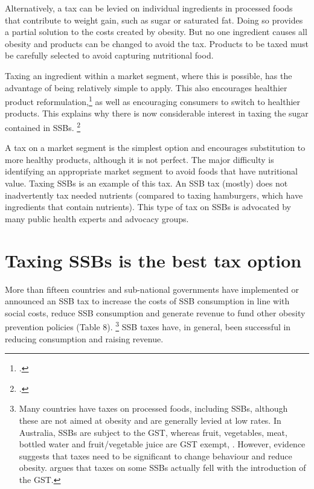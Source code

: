 \documentclass[embargoed]{grattan}
\begin{document}
Alternatively, a tax can be levied on individual ingredients in processed foods that contribute to weight gain, such as sugar or saturated fat.
Doing so provides a partial solution to the costs created by obesity.
But no one ingredient causes all obesity and products can be changed to avoid the tax.
Products to be taxed must be carefully selected to avoid capturing nutritional food.

Taxing an ingredient within a market segment, where this is possible, has the advantage of being relatively simple to apply.
This also encourages healthier product reformulation,\footcite{Team2016Sugarlevyworking} as well as encouraging consumers to switch to healthier products.
This explains why there is now considerable interest in taxing the sugar contained in SSBs.%
\footcites{Smith2016SoftDrinksLevy}{SouthAfricaNationalTreasury2016TaxationSugarSweetened}

A tax on a market segment is the simplest option and encourages substitution to more healthy products, although it is not perfect.
The major difficulty is identifying an appropriate market segment to avoid foods that have nutritional value.
Taxing SSBs is an example of this tax.
An SSB tax (mostly) does not inadvertently tax needed nutrients (compared to taxing hamburgers, which have ingredients that contain nutrients).
This type of tax on SSBs is advocated by many public health experts and advocacy groups.

\section{Taxing SSBs is the best tax option }\label{taxing-ssbs-is-the-best-tax-option}

More than fifteen countries and sub-national governments have implemented or announced an SSB tax to increase the costs of SSB consumption in line with social costs, reduce SSB consumption and generate revenue to fund other obesity prevention policies (Table 8).%
\footnote{Many countries have taxes on processed foods, including SSBs, although these are not aimed at obesity and are generally levied at low rates.
In Australia, SSBs are subject to the GST, whereas fruit, vegetables, meat, bottled water and fruit/vegetable juice are GST exempt, \textcite{Office2016GSTstatusfood}.
However, evidence suggests that taxes need to be significant to change behaviour and reduce obesity. \textcite{Australia2014Rethinktaxdiscussion} argues that taxes on some SSBs actually fell with the introduction of the GST.} SSB taxes have, in general, been successful in reducing consumption and raising revenue.
\end{document}
